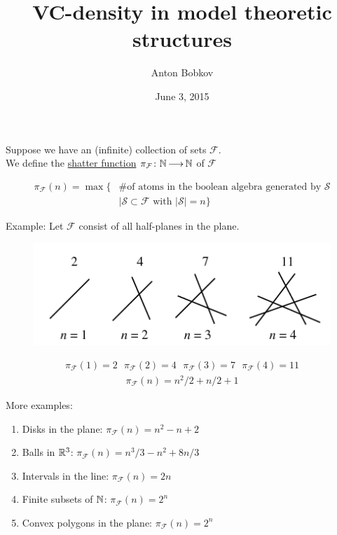 \documentclass{beamer}
\title{VC-density in model theoretic structures}
\author{Anton Bobkov}
\date{June 3, 2015}
\newcommand{\F}{\mathcal F}
\newcommand{\defn}{\underline}
\begin{document}
\maketitle

\begin{frame}
	Suppose we have an (infinite) collection of sets $\F$. \\
	We define the \defn{shatter function} $\pi_\F \colon \N \arr \N$ of $\F$

	\begin{align*}
		\pi_\F(n) = \max \{ &\text {\# of atoms in the boolean algebra generated by $\mathcal S$} \\
		            &\mid \mathcal S \subset \F \text{ with } |\mathcal S| = n\}
	\end{align*}
\end{frame}

\begin{frame}
	Example: Let $\F$ consist of all half-planes in the plane.
	\begin{figure}[p]
    \centering
    \includegraphics[scale=0.75]{lines.png}
	\end{figure}
	\begin{align*}
		\pi_\F(1) = 2 \ \ \  \pi_\F(2) = 4 \ \ \  \pi_\F(3) = 7  \ \ \ \pi_\F(4) = 11
	\end{align*}
	\begin{align*}
		\pi_\F(n) = n^2/2 + n/2 + 1
	\end{align*}
\end{frame}

\begin{frame}
More examples: \\
	\begin{enumerate}
		\item Disks in the plane:	$\pi_\F(n) = n^2 - n + 2$
		\item Balls in $\mathbb{R}^3$: $\pi_\F(n) = n^3/3 - n^2 + 8n/3$
		\item Intervals in the line: $\pi_\F(n) = 2n$
		\item Finite subsets of $\mathbb{N}$: $\pi_\F(n) = 2^n$
		\item Convex polygons in the plane: $\pi_\F(n) = 2^n$
	\end{enumerate}
\end{frame}
\end{document}
